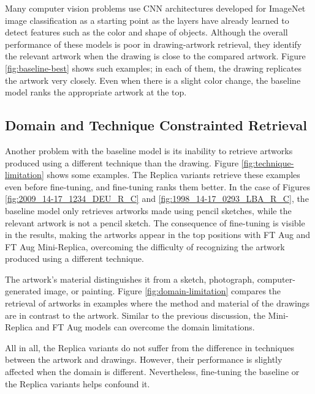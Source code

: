 Many computer vision problems use CNN architectures developed for ImageNet image classification as a starting point as the layers have already learned to detect features such as the color and shape of objects. Although the overall performance of these models is poor in drawing-artwork retrieval, they identify the relevant artwork when the drawing is close to the compared artwork. Figure \ref{fig:baseline-best} shows such examples; in each of them, the drawing replicates the artwork very closely. Even when there is a slight color change, the baseline model ranks the appropriate artwork at the top. 

\subsection{Domain and Technique Constrainted Retrieval}

Another problem with the baseline model is its inability to retrieve artworks produced using a different technique than the drawing. Figure \ref{fig:technique-limitation} shows some examples. The Replica variants retrieve these examples even before fine-tuning, and fine-tuning ranks them better. In the case of Figures \ref{fig:2009_14-17_1234_DEU_R_C} and \ref{fig:1998_14-17_0293_LBA_R_C}, the baseline model only retrieves artworks made using pencil sketches, while the relevant artwork is not a pencil sketch. The consequence of fine-tuning is visible in the results, making the artworks appear in the top positions with FT Aug and FT Aug Mini-Replica, overcoming the difficulty of recognizing the artwork produced using a different technique.

The artwork's material distinguishes it from a sketch, photograph, computer-generated image, or painting. Figure \ref{fig:domain-limitation} compares the retrieval of artworks in examples where the method and material of the drawings are in contrast to the artwork. Similar to the previous discussion, the Mini-Replica and FT Aug models can overcome the domain limitations.

All in all, the Replica variants do not suffer from the difference in techniques between the artwork and drawings. However, their performance is slightly affected when the domain is different. Nevertheless, fine-tuning the baseline or the Replica variants helps confound it.

